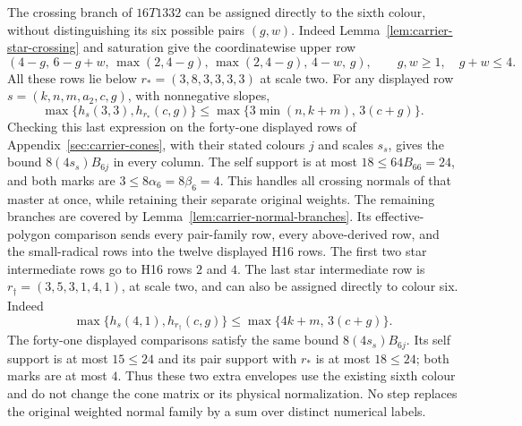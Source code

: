 The crossing branch of $16T1332$ can be assigned directly to the
sixth colour, without distinguishing its six possible pairs $(g,w)$.
Indeed Lemma~\ref{lem:carrier-star-crossing} and saturation give the
coordinatewise upper row
\[
 (4-g,\,6-g+w,\,\max(2,4-g),\,\max(2,4-g),\,4-w,\,g),
 \qquad g,w\geq1,\quad g+w\leq4.
\]
All these rows lie below $r_*=(3,8,3,3,3,3)$ at scale two.
For any displayed row $s=(k,n,m,a_2,c,g)$, with nonnegative slopes,
\[
 \max\{h_s(3,3),h_{r_*}(c,g)\}
 \leq\max\{3\min(n,k+m),\,3(c+g)\}.
\]
Checking this last expression on the forty-one displayed rows of
Appendix~\ref{sec:carrier-cones}, with their stated colours $j$ and
scales $s_s$, gives the bound $8(4s_s)B_{6j}$ in every column.
The self support is at most $18\leq64B_{66}=24$, and both marks
are $3\leq8\alpha_6=8\beta_6=4$.
This handles all crossing normals of that master at once, while
retaining their separate original weights. The remaining branches are
covered by Lemma~\ref{lem:carrier-normal-branches}. Its effective-polygon
comparison sends every pair-family row, every above-derived row, and
the small-radical rows into the twelve displayed H16 rows. The first
two star intermediate rows go to H16 rows $2$ and $4$.
The last star intermediate row is $r_\dagger=(3,5,3,1,4,1)$, at scale
two, and can also be assigned directly to colour six. Indeed
\[
 \max\{h_s(4,1),h_{r_\dagger}(c,g)\}
 \leq\max\{4k+m,\,3(c+g)\}.
\]
The forty-one displayed comparisons satisfy the same bound
$8(4s_s)B_{6j}$. Its self support is at most $15\leq24$ and its
pair support with $r_*$ is at most $18\leq24$; both marks are at most
$4$. Thus these two extra envelopes use the existing sixth colour
and do not change the cone matrix or its physical normalization.
No step replaces the original weighted normal family by a sum over
distinct numerical labels.

